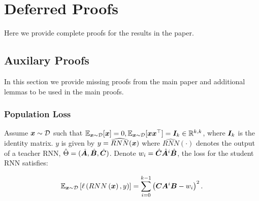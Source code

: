 \section{Deferred Proofs}\label{apdx:a}
Here we provide complete proofs for the results in the paper.

\subsection{Auxilary Proofs}
In this section we provide missing proofs from the main paper and additional lemmas to be used in the main proofs.
\subsubsection{Population Loss}

\begin{lemma}\label{lemma:expected_loss}
Assume ${\bm{x}}\sim \mathcal{D}$ such that $\mathbb{E}_{{\bm{x}}\sim\mathcal{D}}[{\bm{x}}]=0, \mathbb{E}_{{\bm{x}}\sim\mathcal{D}}[{\bm{x}}{\bm{x}}^\top]={\bm{I}}_k \in \mathbb{R}^{k,k}$, where ${\bm{I}}_k$ is the identity matrix. $y$ is given by $y=\widehat{RNN}({\bm{x}})$ where $\widehat{RNN}(\cdot)$ denotes the output of a teacher RNN, $\hat{\Theta}=(\hat{{\bm{A}}}, \hat{{\bm{B}}}, \hat{{\bm{C}}})$. Denote $w_i=\hat{{\bm{C}}}\hat{{\bm{A}}}^i\hat{{\bm{B}}}$, the loss for the student RNN satisfies:

\begin{equation}\label{eq:apdx:pop_loss}
    \mathbb{E}_{{\bm{x}}\sim\mathcal{D}}\left[\ell\left( RNN\left({\bm{x}}\right), y\right)\right] = \sum_{i=0}^{k-1} \left( {\bm{C}}{\bm{A}}^i{\bm{B}} - w_i \right)^2.
\end{equation}

\end{lemma}

